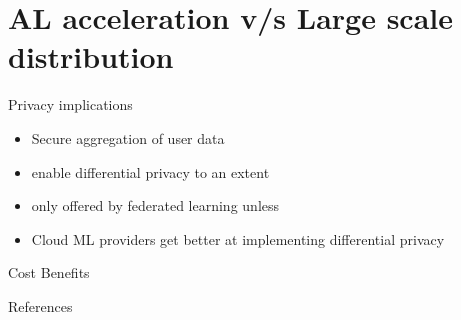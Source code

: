 \documentclass[10pt]{beamer}
\begin{document}
\section{AL acceleration v/s Large scale distribution}
\begin{frame}{Privacy implications}
  \begin{itemize}
  \item Secure aggregation of user data
  \item enable differential privacy to an extent
  \item only offered by federated learning unless
  \item Cloud ML providers get better at implementing differential privacy
  \end{itemize}
\end{frame}
\begin{frame}{Cost Benefits}
\end{frame}
\begin{frame}{References}
  
\end{frame}
\end{document}

